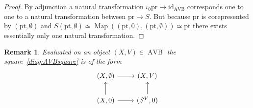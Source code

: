 \documentclass{article}
\newcommand{\pt}{\mathrm{pt}}
\newcommand{\pr}{\mathrm{pr}}
\newcommand{\id}{\mathrm{id}}
\DeclareMathOperator{\AVB}{AVB}
\DeclareMathOperator{\An}{An}
\DeclareMathOperator{\Map}{Map}
\newtheorem{remark}{Remark}
\begin{document}
\begin{proof}
    By adjunction a natural transformation $\iota_0 \pr \to \id_{\AVB}$ corresponds one to one to a natural transformation between 
    $\pr \to S$. But because $\pr$ is corepresented by $(\pt, \emptyset)$ and $S(\pt, \emptyset) \simeq \Map((\pt, 0), (\pt, \emptyset))\simeq \pt$
    there exists essentially only one natural transformation. 
\end{proof}

\begin{remark}
Evaluated on an object $(X,V) \in \AVB$ the square~\ref{diag:AVBsquare} is of the form 
\[\begin{tikzcd}
	{(X,\emptyset)} & {(X,V)} \\
	{(X,0)} & {(S^V,0)}
	\arrow[from=2-1, to=1-1]
	\arrow[from=1-1, to=1-2]
	\arrow[from=2-1, to=2-2]
	\arrow[from=2-2, to=1-2]
\end{tikzcd}\label{diag:AVBsquareeval}\]
\end{remark}




\end{document}
